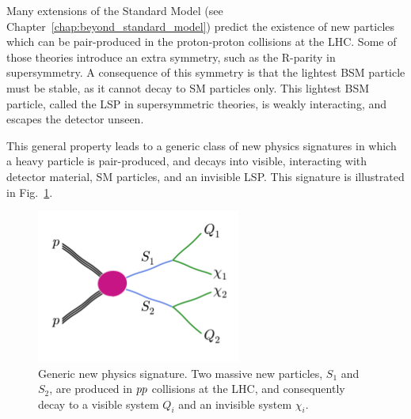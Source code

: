 

Many extensions of the Standard Model (see Chapter~\ref{chap:beyond_standard_model}) predict the 
existence of new particles which can be pair-produced in the proton-proton collisions at the LHC. 
Some of those theories introduce an extra symmetry, such as the R-parity in supersymmetry. A
consequence of this symmetry is that the lightest BSM particle must be stable, as it cannot decay
to SM particles only. This lightest BSM particle, called the LSP in supersymmetric theories, is
weakly interacting, and escapes the detector unseen. 

This general property leads to a generic class of new physics signatures in which a heavy
particle is pair-produced, and decays into visible, \ie interacting with detector material, SM
particles, and an invisible LSP. This signature is illustrated in Fig.~\ref{fig:razor_signature}.

\begin{figure}[htb]
  \centering
  \includegraphics[width=0.6\textwidth,clip=true,trim=0 1.8cm 0
0.8cm]{figures/razor_variables/signature} 
  \caption{Generic new physics signature. Two massive new particles, $S_1$ and $S_2$, are produced
in ${p}{p}$ collisions at the LHC, and consequently decay to a visible system $Q_i$ and an invisible
system $\chi_i$. \label{fig:razor_signature}}
\end{figure}

